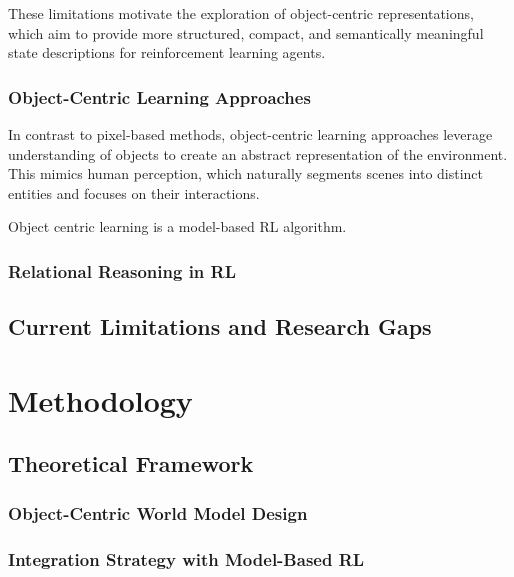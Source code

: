 \documentclass[
	english,
	ruledheaders=section,
	class=report,
	thesis={type=master},
	accentcolor=9c,
	custommargins=true,
	marginpar=false,
	parskip=half-,
	fontsize=11pt,
]{tudapub}
\begin{document}
These limitations motivate the exploration of object-centric representations, which aim to provide more structured, compact, and semantically meaningful state descriptions for reinforcement learning agents.

\subsection{Object-Centric Learning Approaches}
\label{subsec:oc_approaches}

In contrast to pixel-based methods, object-centric learning approaches leverage understanding of objects to create an abstract representation of the environment. 
This mimics human perception, which naturally segments scenes into distinct entities and focuses on their interactions. \cite{nanbo2021learningobjectcentricrepresentationsmultiobject}

Object centric learning \cite{delfosse2024ocatariobjectcentricatari2600} is a model-based RL algorithm.

\subsection{Relational Reasoning in RL}
\label{subsec:relational_reasoning}

\section{Current Limitations and Research Gaps}
\label{sec:limitations}



\chapter{Methodology}
\label{chap:methodology}

\section{Theoretical Framework}
\label{sec:framework}

\subsection{Object-Centric World Model Design}
\label{subsec:oc_world_model}

\subsection{Integration Strategy with Model-Based RL}
\label{subsec:integration_strategy}
\end{document}
